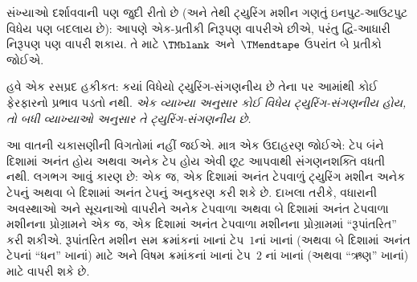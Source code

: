 \documentclass[../../../include/open-logic-section]{subfiles}
\begin{document}
સંખ્યાઓ દર્શાવવાની પણ જુદી રીતો છે (અને તેથી ટ્યુરિંગ
મશીન ગણતું ઇનપુટ-આઉટપુટ વિધેય પણ બદલાય છે): આપણે
એક-પ્રતીકી નિરૂપણ વાપરીએ છીએ, પરંતુ દ્વિ-આધારી
નિરૂપણ પણ વાપરી શકાય. તે માટે $\TMblank$ અને~$\TMendtape$
ઉપરાંત બે પ્રતીકો જોઈએ.

હવે એક રસપ્રદ હકીકત: કયાં વિધેયો ટ્યુરિંગ-સંગણનીય છે
તેના પર આમાંથી કોઈ ફેરફારનો પ્રભાવ પડતો નથી.
\emph{એક વ્યાખ્યા અનુસાર કોઈ વિધેય ટ્યુરિંગ-સંગણનીય
હોય, તો બધી વ્યાખ્યાઓ અનુસાર તે ટ્યુરિંગ-સંગણનીય છે.}

આ વાતની ચકાસણીની વિગતોમાં નહીં જઈએ. માત્ર એક
ઉદાહરણ જોઈએ: ટેપ બંને દિશામાં અનંત હોય અથવા
અનેક ટેપ હોય એવી છૂટ આપવાથી સંગણનશક્તિ વધતી
નથી. લગભગ આવું કારણ છે: એક જ, એક દિશામાં
અનંત ટેપવાળું ટ્યુરિંગ મશીન અનેક ટેપનું અથવા બે
દિશામાં અનંત ટેપનું અનુકરણ કરી શકે છે. દાખલા તરીકે,
વધારાની અવસ્થાઓ અને સૂચનાઓ વાપરીને અનેક ટેપવાળા
અથવા બે દિશામાં અનંત ટેપવાળા મશીનના પ્રોગ્રામને
એક જ, એક દિશામાં અનંત ટેપવાળા મશીનના પ્રોગ્રામમાં
``રૂપાંતરિત'' કરી શકીએ. રૂપાંતરિત મશીન સમ ક્રમાંકનાં
ખાનાં ટેપ~$1$નાં ખાનાં (અથવા બે દિશામાં અનંત ટેપનાં
``ધન'' ખાનાં) માટે અને વિષમ ક્રમાંકનાં ખાનાં ટેપ~$2$
નાં ખાનાં (અથવા ``ઋણ'' ખાનાં) માટે વાપરી શકે છે.
\end{document}
